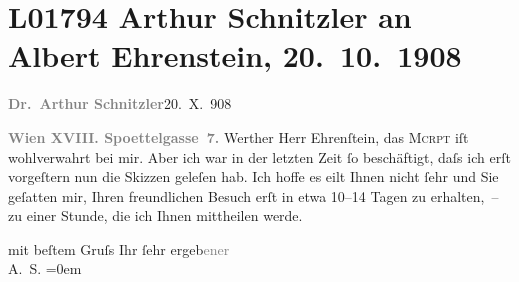 

\section[Arthur Schnitzler an Albert Ehrenstein, 20. 10. 1908]{L01794 Arthur Schnitzler an Albert Ehrenstein, 20. 10. 1908}
\nopagebreak{}
\rehead{ }\normalsize\beginnumbering{}
\toendnotes[C]{\smallbreak\pagebreak[2]}
\toendnotes[C]{\smallbreak}
\pstart
           {\pb}\textcolor{gray}{\textbf{Dr. Arthur Schnitzler}}\hfill 20. X. 908\pend
           
\pstart
           \textcolor{gray}{\textbf{Wien XVIII. Spoettelgasse 7.}}\pend
           \vspace{0.5em}
\pstart
           Werther Herr Ehrenſtein, das \textsc{Mcrpt} iſt wohlverwahrt bei mir. Aber ich war in der letzten Zeit ſo beschäftigt, daſs
               ich erſt vorgeſtern nun die Skizzen geleſen hab. Ich hoffe {\pb}es
               eilt Ihnen nicht ſehr und Sie geſatten mir, Ihren freundlichen Besuch erſt in etwa
               10–14 Tagen zu erhalten, – zu einer Stunde, die ich Ihnen mittheilen werde.\pend
           
\pstart
           mit beſtem Gruſs Ihr ſehr ergeb\textcolor{gray}{ener}{\\[\baselineskip]}\spacefill\mbox{A. S.}\pend
           \leftskip=0em{}\endnumbering{}  
      